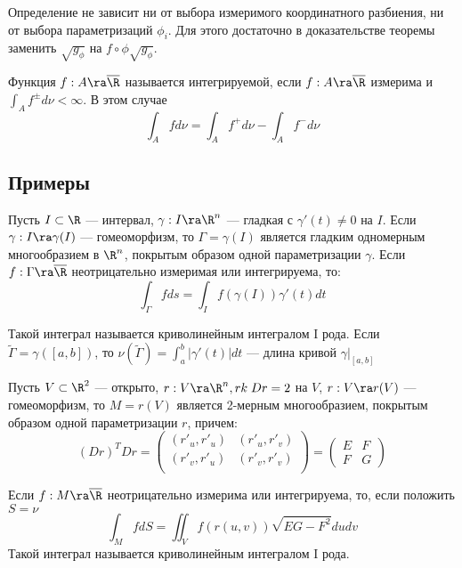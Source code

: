\begin{note}
    Определение не зависит ни от выбора измеримого координатного разбиения, ни от выбора параметризаций \(\phi_i\). Для этого достаточно в доказательстве теоремы заменить \(\sqrt{g_\phi}\) на \(f \circ \phi\sqrt{g_\phi}\).
\end{note}

\begin{definition}
    Функция \(f: A \ra \overline{\R}\) называется интегрируемой, если \(f: A \ra \overline{\R}\) измерима и \(\int_{A} f^\pm d\nu < \infty\). В этом случае
    \[\int_A f d \nu = \int_A f^+ d \nu - \int_A f^- d \nu\]
\end{definition}

\subsection{Примеры}

\begin{example}
    Пусть \(I \subset \R\) --- интервал, \(\gamma: I \ra \R^n\) --- гладкая с \(\gamma'(t) \ne 0\) на \(I\). Если \(\gamma: I \ra \gamma(I)\) --- гомеоморфизм, то \(\Gamma = \gamma(I)\) является гладким одномерным многообразием в \(\R^n\), покрытым образом одной параметризации \(\gamma\). Если \(f: \Gamma \ra \overline{\R}\) неотрицательно измеримая или интегрируема, то:
    \[\int_{\Gamma}f ds = \int_I f(\gamma(I))\gamma'(t)dt\]

    Такой интеграл называется криволинейным интегралом I рода. Если \(\tilde{\Gamma} = \gamma([a, b])\), то \(\nu(\tilde{\Gamma}) = \int_a^b |\gamma'(t)|dt\) --- длина кривой \(\gamma|_{[a, b]}\)
\end{example}

\begin{example}
    Пусть \(V \subset \R^2\) --- открыто, \(r: V \ra \R^n, rk\;Dr = 2\) на \(V\), \(r: V \ra r(V)\) --- гомеоморфизм, то \(M = r(V)\) является 2-мерным многообразием, покрытым образом одной параметризации \(r\), причем:
    \[(Dr)^TDr = \left( \begin{array}{cc}
        (r'_u, r'_u) & (r'_u, r'_v) \\
        (r'_v, r'_u) & (r'_v, r'_v) \\
    \end{array} \right) = \left( \begin{array}{cc}
        E & F \\
        F & G
    \end{array} \right)\]

    Если \(f: M \ra \overline{\R}\) неотрицательно измерима или интегрируема, то, если положить \(S = \nu\)
    \[\int_M f dS = \iint_V f(r(u, v))\sqrt{EG - F^2}dudv\]
    Такой интеграл называется криволинейным интегралом I рода.
\end{example}

